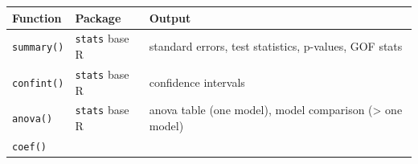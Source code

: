 \documentclass[]{book}
\begin{document}
\begin{longtable}[]{@{}lll@{}}
\toprule
\begin{minipage}[b]{0.16\columnwidth}\raggedright\strut
Function\strut
\end{minipage} & \begin{minipage}[b]{0.17\columnwidth}\raggedright\strut
Package\strut
\end{minipage} & \begin{minipage}[b]{0.58\columnwidth}\raggedright\strut
Output\strut
\end{minipage}\tabularnewline
\midrule
\endhead
\begin{minipage}[t]{0.16\columnwidth}\raggedright\strut
\texttt{summary()}\strut
\end{minipage} & \begin{minipage}[t]{0.17\columnwidth}\raggedright\strut
\texttt{stats} base R\strut
\end{minipage} & \begin{minipage}[t]{0.58\columnwidth}\raggedright\strut
standard errors, test statistics, p-values, GOF stats\strut
\end{minipage}\tabularnewline
\begin{minipage}[t]{0.16\columnwidth}\raggedright\strut
\texttt{confint()}\strut
\end{minipage} & \begin{minipage}[t]{0.17\columnwidth}\raggedright\strut
\texttt{stats} base R\strut
\end{minipage} & \begin{minipage}[t]{0.58\columnwidth}\raggedright\strut
confidence intervals\strut
\end{minipage}\tabularnewline
\begin{minipage}[t]{0.16\columnwidth}\raggedright\strut
\texttt{anova()}\strut
\end{minipage} & \begin{minipage}[t]{0.17\columnwidth}\raggedright\strut
\texttt{stats} base R\strut
\end{minipage} & \begin{minipage}[t]{0.58\columnwidth}\raggedright\strut
anova table (one model), model comparison (\textgreater{} one
model)\strut
\end{minipage}\tabularnewline
\begin{minipage}[t]{0.16\columnwidth}\raggedright\strut
\texttt{coef()}\strut
\end{minipage} & \begin{minipage}[t]{0.17\columnwidth}\raggedright\strut

\end{minipage}
\end{longtable}
\end{document}
